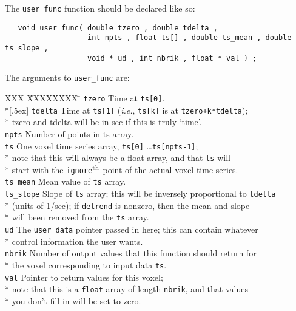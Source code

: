 The {\tt user\_func} function should be declared like so:
\begin{verbatim}
   void user_func( double tzero , double tdelta ,
                   int npts , float ts[] , double ts_mean , double ts_slope ,
                   void * ud , int nbrik , float * val ) ;
\end{verbatim}
The arguments to {\tt user\_func} are:
\begin{tabbing}
 XXX \= XXXXXXXX \= \kill
   \> {\tt tzero}  \>  Time at {\tt ts[0]}. \\*[.5ex]
   \> {\tt tdelta} \>  Time at {\tt ts[1]} ({\it i.e.}, {\tt ts[k]} is at {\tt tzero+k*tdelta}); \\*
   \>              \>  \blob tzero and tdelta will be in sec if this is truly `time'. \\[.5ex]
   \> {\tt npts}   \>  Number of points in ts array.\\[.5ex]
   \> {\tt ts}     \>  One voxel time series array, {\tt ts[0]} \ldots {\tt ts[npts-1]}; \\*
   \>              \>  \blob note that this will always be a float array, and that {\tt ts} will \\*
   \>              \>  \blob start with the {\tt ignore}$^{\rm th}$ point of the actual voxel time series. \\[.5ex]
   \> {\tt ts\_mean} \>  Mean value of {\tt ts} array. \\[.5ex]
   \> {\tt ts\_slope} \>  Slope of {\tt ts} array; this will be inversely proportional to {\tt tdelta} \\*
   \>                \> \blob (units of 1/sec); if {\tt detrend} is nonzero, then the mean and slope \\*
   \>                \> \blob will been removed from the {\tt ts} array. \\[.5ex]
   \> {\tt ud}     \>  The {\tt user\_data} pointer passed in here; this can contain whatever \\*
   \>              \>  \blob control information the user wants. \\[.5ex]
   \> {\tt nbrik}  \>  Number of output values that this function should return for \\*
   \>              \>   \blob the voxel corresponding to input data {\tt ts}. \\[.5ex]
   \> {\tt val}    \>  Pointer to return values for this voxel; \\*
   \>              \> \blob  note that this is a {\tt float} array of length {\tt nbrik}, and that values \\*
   \>              \> \blob  you don't fill in will be set to zero.
\end{tabbing}
